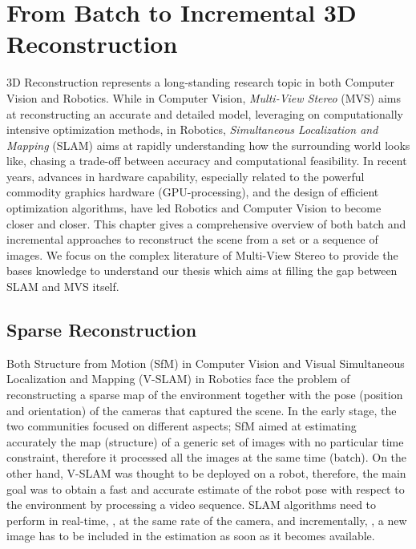 \chapter{From Batch to Incremental 3D Reconstruction}
\label{ch:soa}

3D Reconstruction represents a long-standing research topic in both Computer Vision and Robotics. 
While in Computer Vision, \emph{Multi-View Stereo} (MVS) aims at reconstructing an accurate and detailed model, leveraging on computationally intensive optimization methods, in Robotics, \emph{Simultaneous Localization and Mapping}  (SLAM) aims at rapidly understanding how the surrounding world looks like, chasing a trade-off between accuracy and computational feasibility.
In recent years, advances in hardware capability, especially related to the powerful commodity graphics hardware (GPU-processing), and the design of efficient optimization algorithms, have led Robotics and Computer Vision to become closer and closer.
This chapter gives a comprehensive overview of both batch and incremental approaches to reconstruct the scene from a set or a sequence of images. We focus on the complex literature of Multi-View Stereo to provide  the bases knowledge to understand our thesis which aims at filling the gap between SLAM and MVS itself. 

\minitoc
\newpage


\section{Sparse Reconstruction}
\label{sec:slam}
Both Structure from Motion (SfM) in Computer Vision and Visual Simultaneous Localization and Mapping (V-SLAM) in Robotics face the problem of reconstructing a sparse map of the environment together with the pose (position and orientation) of the cameras that captured the scene.
In the early stage, the two communities focused on different aspects; 
SfM aimed at estimating accurately the map (structure) of a generic set of images with no particular time constraint, therefore it processed all the images at the same time (batch).
On the other hand, V-SLAM was thought to be deployed on a robot, therefore, the main goal was to obtain a fast and accurate estimate of the robot pose with respect to the environment by processing a video sequence. SLAM algorithms need to perform in real-time, \ie, at the same rate of the camera, and incrementally, \ie, a new image  has to be included in the estimation as soon as it becomes available.


